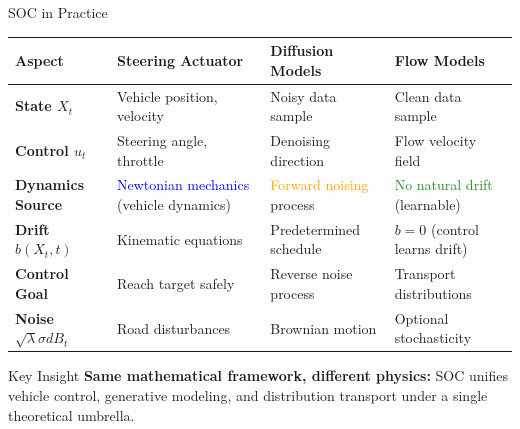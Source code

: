 \documentclass[aspectratio=169,xcolor=dvipsnames]{beamer}
\begin{document}
\begin{frame}{SOC in Practice}

    \vspace{-0.3cm}
    \begin{table}
        \centering
        \small
        \begin{tabular}{>{\centering\arraybackslash}p{}|>{\centering\arraybackslash}p{}|>{\centering\arraybackslash}p{}|>{\centering\arraybackslash}p{}}
            \toprule
            \textbf{Aspect} & \textbf{Steering Actuator} & \textbf{Diffusion Models} & \textbf{Flow Models} \\
            \midrule
            \textbf{State $X_t$} & Vehicle position, velocity & Noisy data sample & Clean data sample \\
            \midrule
            \textbf{Control $u_t$} & Steering angle, throttle & Denoising direction & Flow velocity field \\
            \midrule
            \textbf{Dynamics Source} & \textcolor{blue}{Newtonian mechanics} (vehicle dynamics) & \textcolor{orange}{Forward noising} process & \textcolor{ForestGreen}{No natural drift} (learnable) \\
            \midrule
            \textbf{Drift $b(X_t,t)$} & Kinematic equations & Predetermined schedule & $b = 0$ (control learns drift) \\
            \midrule
            \textbf{Control Goal} & Reach target safely & Reverse noise process & Transport distributions \\
            \midrule
            \textbf{Noise $\sqrt{\lambda}\sigma dB_t$} & Road disturbances & Brownian motion & Optional stochasticity \\
            \bottomrule
        \end{tabular}
    \end{table}
    
    \vspace{0.3cm}
    
    \begin{alertblock}{Key Insight}
        \textbf{Same mathematical framework, different physics:} SOC unifies vehicle control, generative modeling, and distribution transport under a single theoretical umbrella.
    \end{alertblock}

\end{frame}
\end{document}
